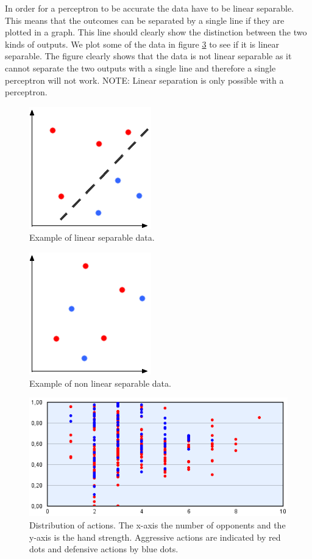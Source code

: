 In order for a perceptron to be accurate the data have to be linear separable. This means that the outcomes can be separated by a single line if they are plotted in a graph. This line should clearly show the distinction between the two kinds of outputs. We plot some of the data in figure \ref{fig:linear-separable} to see if it is linear separable.  The figure clearly shows that the data is not linear separable as it cannot separate the two outputs with a single line and therefore a single perceptron will not work. NOTE: Linear separation is only possible with a perceptron.
\begin{figure}[H]
  \center
    \includegraphics[scale=0.8]{images/nn/separable.png}
  \caption{Example of linear separable data.\label{fig:lsexample}}
\end{figure}

\begin{figure}[H]
  \center
    \includegraphics[scale=0.8]{images/nn/non-separable.png}
  \caption{Example of non linear separable data.\label{fig:nlsexample}}
\end{figure}

\begin{figure}[H]
  \center
    \includegraphics[scale=0.8]{images/nn/default-nn1-plot.png}
  \caption{Distribution of actions. The x-axis  the number of opponents and the y-axis is the hand strength. Aggressive actions are indicated by red dots and defensive actions by blue dots. \label{fig:linear-separable}}
\end{figure}

